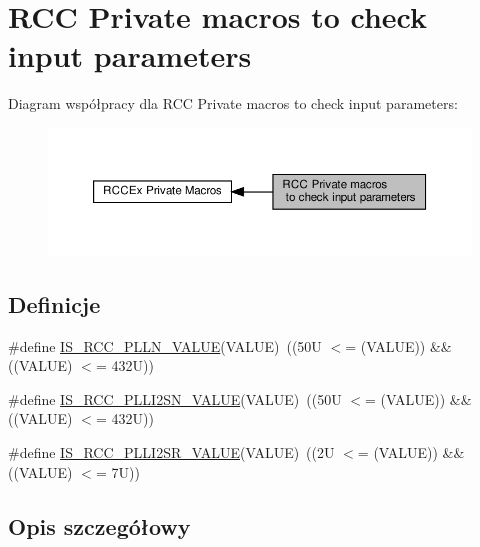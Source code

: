 \hypertarget{group___r_c_c_ex___i_s___r_c_c___definitions}{}\section{R\+CC Private macros to check input parameters}
\label{group___r_c_c_ex___i_s___r_c_c___definitions}
Diagram współpracy dla R\+CC Private macros to check input parameters\+:\nopagebreak
\begin{figure}[H]
\begin{center}
\leavevmode
\includegraphics[width=350pt]{group___r_c_c_ex___i_s___r_c_c___definitions}
\end{center}
\end{figure}
\subsection*{Definicje}
\begin{DoxyCompactItemize}
\item 
\#define \hyperlink{group___r_c_c_ex___i_s___r_c_c___definitions_ga12835741fbedd278ad1e91abebe00837}{I\+S\+\_\+\+R\+C\+C\+\_\+\+P\+L\+L\+N\+\_\+\+V\+A\+L\+UE}(V\+A\+L\+UE)~((50\+U $<$= (\+V\+A\+L\+U\+E)) \&\& ((\+V\+A\+L\+U\+E) $<$= 432\+U))
\item 
\#define \hyperlink{group___r_c_c_ex___i_s___r_c_c___definitions_gac30fb7f6fe9f22a7d6c5585909db5c3c}{I\+S\+\_\+\+R\+C\+C\+\_\+\+P\+L\+L\+I2\+S\+N\+\_\+\+V\+A\+L\+UE}(V\+A\+L\+UE)~((50\+U $<$= (\+V\+A\+L\+U\+E)) \&\& ((\+V\+A\+L\+U\+E) $<$= 432\+U))
\item 
\#define \hyperlink{group___r_c_c_ex___i_s___r_c_c___definitions_gaa2fece4b24f6219b423e1b092b7705c8}{I\+S\+\_\+\+R\+C\+C\+\_\+\+P\+L\+L\+I2\+S\+R\+\_\+\+V\+A\+L\+UE}(V\+A\+L\+UE)~((2\+U $<$= (\+V\+A\+L\+U\+E)) \&\& ((\+V\+A\+L\+U\+E) $<$= 7\+U))
\end{DoxyCompactItemize}


\subsection{Opis szczegółowy}


